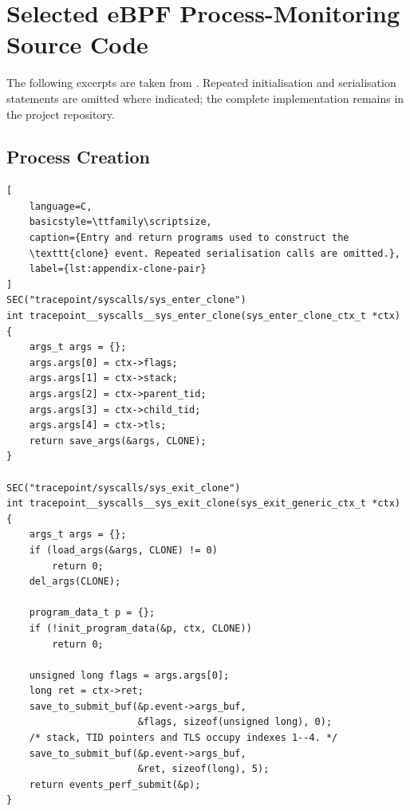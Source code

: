 \chapter{Selected eBPF Process-Monitoring Source Code}
\label{appendix_a}

The following excerpts are taken from
. Repeated initialisation and serialisation
statements are omitted where indicated; the complete implementation remains in
the project repository.

\section{Process Creation}
\label{sec:appendix-process-creation}

\begin{lstlisting}[
    language=C,
    basicstyle=\ttfamily\scriptsize,
    caption={Entry and return programs used to construct the
    \texttt{clone} event. Repeated serialisation calls are omitted.},
    label={lst:appendix-clone-pair}
]
SEC("tracepoint/syscalls/sys_enter_clone")
int tracepoint__syscalls__sys_enter_clone(sys_enter_clone_ctx_t *ctx)
{
    args_t args = {};
    args.args[0] = ctx->flags;
    args.args[1] = ctx->stack;
    args.args[2] = ctx->parent_tid;
    args.args[3] = ctx->child_tid;
    args.args[4] = ctx->tls;
    return save_args(&args, CLONE);
}

SEC("tracepoint/syscalls/sys_exit_clone")
int tracepoint__syscalls__sys_exit_clone(sys_exit_generic_ctx_t *ctx)
{
    args_t args = {};
    if (load_args(&args, CLONE) != 0)
        return 0;
    del_args(CLONE);

    program_data_t p = {};
    if (!init_program_data(&p, ctx, CLONE))
        return 0;

    unsigned long flags = args.args[0];
    long ret = ctx->ret;
    save_to_submit_buf(&p.event->args_buf,
                       &flags, sizeof(unsigned long), 0);
    /* stack, TID pointers and TLS occupy indexes 1--4. */
    save_to_submit_buf(&p.event->args_buf,
                       &ret, sizeof(long), 5);
    return events_perf_submit(&p);
}
\end{lstlisting}

